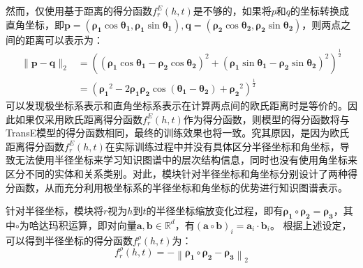 \documentclass[algorithmlist, AutoFakeBold, AutoFakeSlant, figurelist, tablelist, nomlist, engineering]{seuthesix}
\begin{document}
然而，仅使用基于距离的得分函数$f^E_r(h, t)$是不够的，如果将$p$和$q$的坐标转换成直角坐标，即$\bm{p}=\left(\bm{\rho_1} \cos \bm{\theta_1}, \bm{\rho_1} \sin \bm{\theta_1}\right), \bm{q}=\left(\bm{\rho_2} \cos \bm{\theta_2}, \bm{\rho_2} \sin \bm{\theta_2}\right)$，则两点之间的距离可以表示为：
\begin{equation}
  \begin{aligned}
  \|\bm{p}-\bm{q}\|_2 & =\left(\left(\bm{\rho_1} \cos \bm{\theta_1}-\bm{\rho_2} \cos \bm{\theta_2}\right)^2+\left(\bm{\rho_1} \sin \bm{\theta_1}-\bm{\rho_2} \sin \bm{\theta_2}\right)^2\right)^{\frac{1}{2}} \\
  & =\left(\bm{\rho_1}^2-2 \bm{\rho_1} \bm{\rho_2} \cos \left(\bm{\theta_1}-\bm{\theta_2}\right)+\bm{\rho_2}^2\right)^{\frac{1}{2}}
  \end{aligned}
\end{equation}
可以发现极坐标系表示和直角坐标系表示在计算两点间的欧氏距离时是等价的。因此如果仅采用欧氏距离得分函数$f^E_r(h, t)$作为得分函数，则模型的得分函数将与TransE模型的得分函数相同，最终的训练效果也将一致。究其原因，是因为欧氏距离得分函数$f^E_r(h, t)$在实际训练过程中并没有具体区分半径坐标和角坐标，导致无法使用半径坐标来学习知识图谱中的层次结构信息，同时也没有使用角坐标来区分不同的实体和关系类别。对此，模块针对半径坐标和角坐标分别设计了两种得分函数，从而充分利用极坐标系的半径坐标和角坐标的优势进行知识图谱表示。

针对半径坐标，模块将$r$视为$h$到$t$的半径坐标缩放变化过程，即有$\bm{\rho_1} \circ \bm{\rho_2} = \bm{\rho_3}$，其中$\circ$为哈达玛积运算，即对向量$\bm{a}, \bm{b} \in \mathbb{R}^{d}$，有$\left(\mathbf{a} \circ \mathbf{b}\right)_i = \mathbf{a}_i \cdot \mathbf{b}_i$。
根据上述设定，可以得到半径坐标的得分函数$f^{\rho}_r(h, t)$为：
\begin{equation}
  f^{\rho}_r\left(h, t\right) =-\left\|\bm{\rho_1} \circ \bm{\rho_2} - \bm{\rho_3}\right\|_2
\end{equation}
\end{document}
